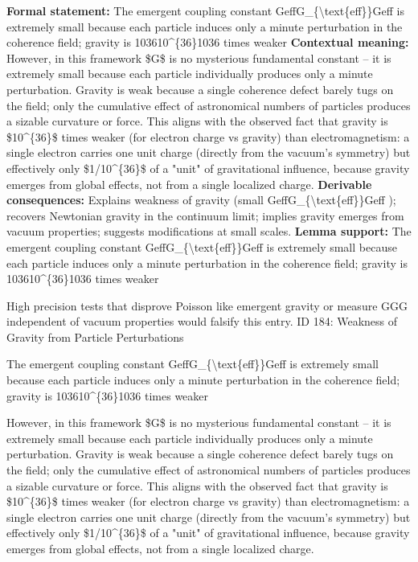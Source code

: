 \begingroup\footnotesize\setlength{\emergencystretch}{3em}\sloppy
\textbf{Formal statement:} The emergent coupling constant GeffG\_\{\textbackslash{}text\{eff\}\}Geff is extremely small because each particle induces only a minute perturbation in the coherence field; gravity is 103610\textasciicircum{}\{36\}1036 times weaker
\textbf{Contextual meaning:} However, in this framework \$G\$ is no mysterious fundamental constant -- it is extremely small because each particle individually produces only a minute perturbation. Gravity is weak because a single coherence defect barely tugs on the field; only the cumulative effect of astronomical numbers of particles produces a sizable curvature or force. This aligns with the observed fact that gravity is \$10\textasciicircum{}\{36\}\$ times weaker (for electron charge vs gravity) than electromagnetism: a single electron carries one unit charge (directly from the vacuum's symmetry) but effectively only \$1/10\textasciicircum{}\{36\}\$ of a "unit" of gravitational influence, because gravity emerges from global effects, not from a single localized charge.
\textbf{Derivable consequences:} Explains weakness of gravity (small GeffG\_\{\textbackslash{}text\{eff\}\}Geff ); recovers Newtonian gravity in the continuum limit; implies gravity emerges from vacuum properties; suggests modifications at small scales.
\textbf{Lemma support:} The emergent coupling constant GeffG\_\{\textbackslash{}text\{eff\}\}Geff is extremely small because each particle induces only a minute perturbation in the coherence field; gravity is 103610\textasciicircum{}\{36\}1036 times weaker\par
\endgroup

High precision tests that disprove Poisson like emergent gravity or measure GGG independent of vacuum properties would falsify this entry. ID 184: Weakness of Gravity from Particle Perturbations

The emergent coupling constant GeffG\_\{\textbackslash{}text\{eff\}\}Geff is extremely small because each particle induces only a minute perturbation in the coherence field; gravity is 103610\textasciicircum{}\{36\}1036 times weaker

However, in this framework \$G\$ is no mysterious fundamental constant -- it is extremely small because each particle individually produces only a minute perturbation. Gravity is weak because a single coherence defect barely tugs on the field; only the cumulative effect of astronomical numbers of particles produces a sizable curvature or force. This aligns with the observed fact that gravity is \$10\textasciicircum{}\{36\}\$ times weaker (for electron charge vs gravity) than electromagnetism: a single electron carries one unit charge (directly from the vacuum's symmetry) but effectively only \$1/10\textasciicircum{}\{36\}\$ of a "unit" of gravitational influence, because gravity emerges from global effects, not from a single localized charge.
\endgroup

